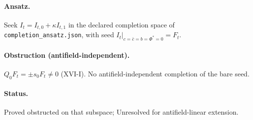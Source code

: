 \paragraph{Ansatz.}
Seek $I_t=I_{t,0}+\kappa I_{t,1}$ in the declared completion space of
\texttt{completion\_ansatz.json}, with seed $I_t\big|_{c=\bar c=b=\Phi^*=0}=F_t$.
\paragraph{Obstruction (antifield-independent).}
$Q_0 F_t=\pm s_0 F_t\neq0$ (XVI-I). No antifield-independent completion of the bare seed.
\paragraph{Status.}
Proved obstructed on that subspace; Unresolved for antifield-linear extension.
